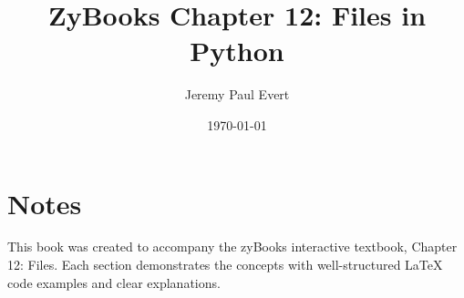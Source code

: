 \documentclass[12pt]{book}
\title{ZyBooks Chapter 12: Files in Python}
\author{Jeremy Paul Evert}
\date{\today}
\begin{document}
\frontmatter
\maketitle
\tableofcontents

\mainmatter







\backmatter
\chapter*{Notes}
This book was created to accompany the zyBooks interactive textbook, Chapter 12: Files. 
Each section demonstrates the concepts with well-structured LaTeX code examples and clear explanations.
\end{document}
